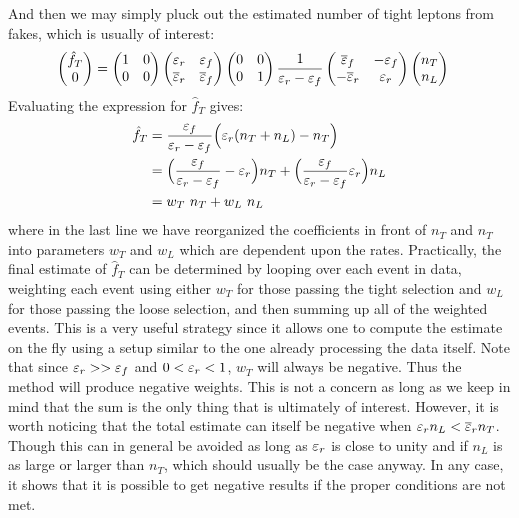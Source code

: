 And then we may simply pluck out the estimated number of tight leptons
from fakes, which is usually of interest:
\begin{align}
  \label{eq:mxm_final_single2}
  \begin{pmatrix} \hat{f}_T \\ 0 \end{pmatrix} 
  &=
  \begin{pmatrix}
  1 & 0\\ 0 & 0
  \end{pmatrix} 
  \begin{pmatrix}
  \varepsilon_r & \varepsilon_f \\ \overline{\varepsilon}_r & \overline{\varepsilon}_f
  \end{pmatrix} 
  \begin{pmatrix}
  0 & 0\\ 0 & 1
  \end{pmatrix} 
  \frac{1}{\varepsilon_r-\varepsilon_f}
  \begin{pmatrix}
  \overline{\varepsilon}_f & -\varepsilon_f \\ -\overline{\varepsilon}_r& \varepsilon_r
  \end{pmatrix} 
  \begin{pmatrix} n_T\\ n_L \end{pmatrix}
\end{align}
Evaluating the expression for $\hat{f}_T$ gives:
\begin{align}
\hat{f}_T &= \frac{\varepsilon_f}{\varepsilon_r-\varepsilon_f} \Big( \varepsilon_r(n_T+n_L) - n_T \Big)  \\
           &= \Big( \frac{\varepsilon_f}{\varepsilon_r-\varepsilon_f} 
	      -\varepsilon_r\Big) n_T 
	      + \Big(\frac{\varepsilon_f}{\varepsilon_r-\varepsilon_f} \varepsilon_r \Big)n_L\\
           &= w_T~n_T + w_L~n_L
\end{align}
where in the last line we have reorganized the coefficients in front
of $n_T$ and $n_T$ into parameters $w_T$ and $w_L$ which are dependent
upon the rates. Practically, the final estimate of $\hat{f}_T$
can be determined by looping over each event in data, weighting each event
using either $w_T$ for those passing the tight selection and
$w_L$ for those passing the loose selection, and then 
summing up all of the weighted events.  This is a very useful 
strategy since it allows one to compute the estimate on the fly
using a setup similar to the one already processing the data itself. %
Note that since $\varepsilon_r>>\varepsilon_f$ and $0<\varepsilon_r<1$,
$w_T$ will always be negative. Thus the method will produce negative weights.
This is not a concern as long as we keep in mind that the sum
is the only thing that is ultimately of interest.
However, it is worth noticing that the total estimate can itself
be negative when $\varepsilon_r n_L< \overline{\varepsilon}_r n_T$.
Though this can in general be avoided as long as $\varepsilon_r$
is close to unity and if $n_L$ is
as large or larger than $n_T$, which should usually be the case
anyway. In any case, it shows that it is possible to get negative
results if the proper conditions are not met.

